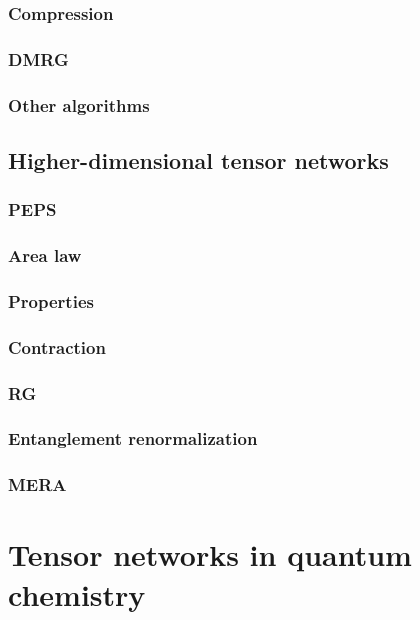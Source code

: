 \documentclass[letterpaper,12pt]{article}
\begin{document}
\subsubsection{Compression}

\subsubsection{DMRG}

\subsubsection{Other algorithms}

\subsection{Higher-dimensional tensor networks}
\subsubsection{PEPS}

\subsubsection{Area law}
\subsubsection{Properties}
\subsubsection{Contraction}

\subsubsection{RG}

\subsubsection{Entanglement renormalization}

\subsubsection{MERA}

\section{Tensor networks in quantum chemistry}
\end{document}
